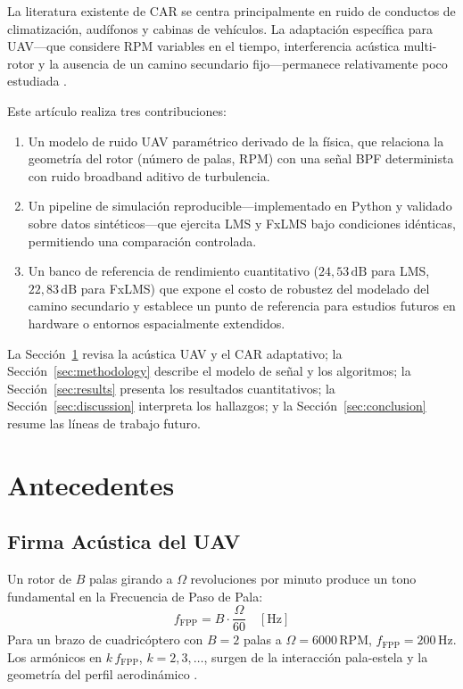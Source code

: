 \documentclass[journal,12pt,onecolumn]{IEEEtran}
\newcommand{\SI}[2]{\ensuremath{#1\,\mathrm{#2}}}
\newcommand{\si}[1]{\ensuremath{\mathrm{#1}}}
\begin{document}
La literatura existente de CAR se centra principalmente en ruido de
conductos de climatización, audífonos y cabinas de vehículos.
La adaptación específica para UAV—que considere RPM variables en el tiempo,
interferencia acústica multi-rotor y la ausencia de un camino secundario
fijo—permanece relativamente poco estudiada \cite{torija2022, strauss2023}.

Este artículo realiza tres contribuciones:
\begin{enumerate}
  \item Un modelo de ruido UAV paramétrico derivado de la física, que
        relaciona la geometría del rotor (número de palas, RPM) con una
        señal BPF determinista con ruido broadband aditivo de turbulencia.
  \item Un pipeline de simulación reproducible—implementado en Python y
        validado sobre datos sintéticos—que ejercita LMS y FxLMS bajo
        condiciones idénticas, permitiendo una comparación controlada.
  \item Un banco de referencia de rendimiento cuantitativo
        (\SI{24,53}{dB} para LMS, \SI{22,83}{dB} para FxLMS) que expone
        el costo de robustez del modelado del camino secundario y establece
        un punto de referencia para estudios futuros en hardware o entornos
        espacialmente extendidos.
\end{enumerate}

La Sección~\ref{sec:background} revisa la acústica UAV y el CAR adaptativo;
la Sección~\ref{sec:methodology} describe el modelo de señal y los
algoritmos; la Sección~\ref{sec:results} presenta los resultados
cuantitativos; la Sección~\ref{sec:discussion} interpreta los hallazgos;
y la Sección~\ref{sec:conclusion} resume las líneas de trabajo futuro.

\section{Antecedentes}
\label{sec:background}

\subsection{Firma Acústica del UAV}

Un rotor de $B$ palas girando a $\Omega$ revoluciones por minuto produce
un tono fundamental en la Frecuencia de Paso de Pala:
\begin{equation}
  f_{\text{FPP}} = B \cdot \frac{\Omega}{60} \quad [\si{Hz}]
  \label{eq:bpf}
\end{equation}
Para un brazo de cuadricóptero con $B=2$ palas a $\Omega = \SI{6000}{RPM}$,
$f_{\text{FPP}} = \SI{200}{Hz}$.
Los armónicos en $k\,f_{\text{FPP}}$, $k = 2,3,\ldots$, surgen de la
interacción pala-estela y la geometría del perfil aerodinámico
\cite{torija2022}.
\end{document}
